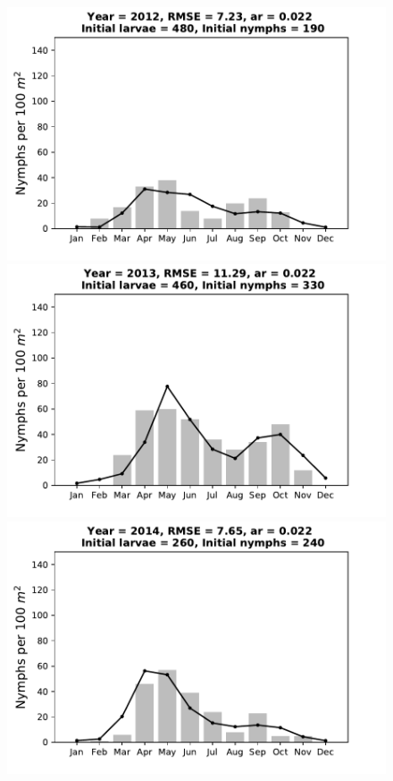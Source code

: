 \documentclass[a4paper, 11pt]{scrartcl}
\begin{document}
\begin{figure}[h!]
\begin{minipage}[c]{0.40\linewidth}
\end{minipage}
\begin{minipage}[c]{0.40\linewidth}
\includegraphics[width=\linewidth]{figures/s3/S3_2012}
\end{minipage}
\begin{minipage}[c]{0.40\linewidth}
\includegraphics[width=\linewidth]{figures/s3/S3_2013}
\end{minipage}
\begin{minipage}[c]{0.40\linewidth}
\includegraphics[width=\linewidth]{figures/s3/S3_2014}

\end{minipage}
\end{figure}
\end{document}
